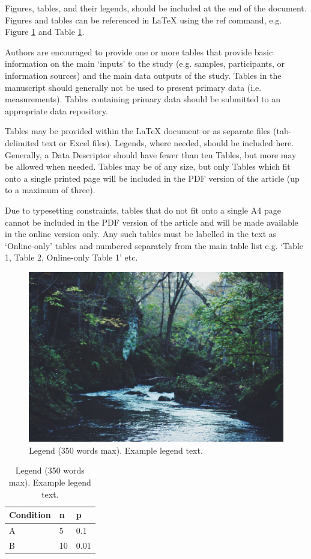 \documentclass[fleqn,10pt]{wlscirep}
\begin{document}
Figures, tables, and their legends, should be included at the end of the document. Figures and tables can be referenced in \LaTeX{} using the ref command, e.g. Figure \ref{fig:stream} and Table \ref{tab:example}. 

Authors are encouraged to provide one or more tables that provide basic information on the main ‘inputs’ to the study (e.g. samples, participants, or information sources) and the main data outputs of the study. Tables in the manuscript should generally not be used to present primary data (i.e. measurements). Tables containing primary data should be submitted to an appropriate data repository.

Tables may be provided within the \LaTeX{} document or as separate files (tab-delimited text or Excel files). Legends, where needed, should be included here. Generally, a Data Descriptor should have fewer than ten Tables, but more may be allowed when needed. Tables may be of any size, but only Tables which fit onto a single printed page will be included in the PDF version of the article (up to a maximum of three). 

Due to typesetting constraints, tables that do not fit onto a single A4 page cannot be included in the PDF version of the article and will be made available in the online version only. Any such tables must be labelled in the text as ‘Online-only’ tables and numbered separately from the main table list e.g. ‘Table 1, Table 2, Online-only Table 1’ etc.

\begin{figure}[ht]
\centering
\includegraphics[width=\linewidth]{stream}
\caption{Legend (350 words max). Example legend text.}
\label{fig:stream}
\end{figure}

\begin{table}[ht]
\centering
\begin{tabular}{|l|l|l|}
\hline
Condition & n & p \\
\hline
A & 5 & 0.1 \\
\hline
B & 10 & 0.01 \\
\hline
\end{tabular}
\caption{\label{tab:example}Legend (350 words max). Example legend text.}
\end{table}
\fi
\end{document}
